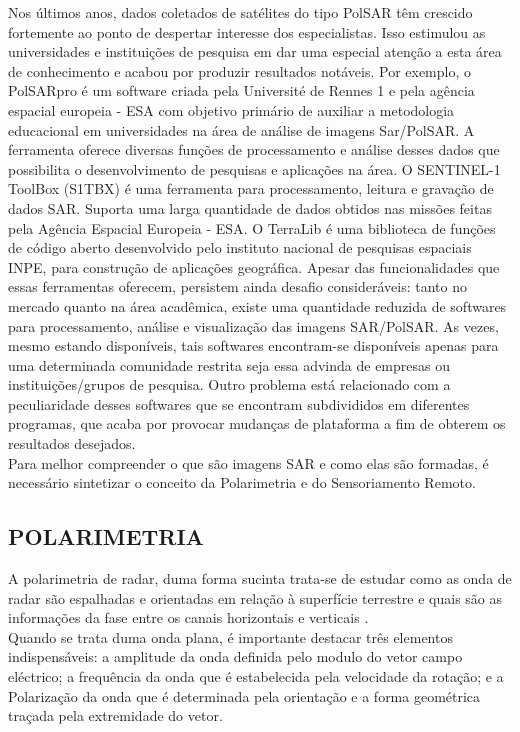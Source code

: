\documentclass[a4paper,12pt]{article}
\begin{document}
Nos últimos anos, dados coletados de satélites do tipo PolSAR têm crescido fortemente ao ponto de despertar interesse dos especialistas. Isso estimulou as universidades e instituições de pesquisa em dar uma especial atenção a esta área de conhecimento e acabou por produzir resultados notáveis.
Por exemplo, o PolSARpro é um software criada pela Université de Rennes 1 e pela agência espacial europeia - ESA com objetivo primário de auxiliar a metodologia educacional em universidades na área de análise de imagens Sar/PolSAR. A ferramenta oferece diversas funções de processamento e análise desses dados que possibilita o desenvolvimento de pesquisas e aplicações na área. O SENTINEL-1 ToolBox (S1TBX) é uma ferramenta para processamento, leitura e gravação de dados SAR. Suporta uma larga quantidade de dados obtidos
nas missões feitas pela Agência Espacial Europeia - ESA. O TerraLib é uma biblioteca de funções de código aberto desenvolvido pelo instituto nacional de pesquisas espaciais INPE, para construção de aplicações geográfica. Apesar das funcionalidades que essas ferramentas oferecem, persistem ainda desafio consideráveis: tanto no mercado quanto na área acadêmica, existe uma quantidade reduzida de softwares para processamento, análise e visualização das imagens SAR/PolSAR. As vezes, mesmo estando disponíveis, tais softwares encontram-se disponíveis apenas para uma determinada comunidade restrita seja essa advinda de empresas ou instituições/grupos de pesquisa. Outro problema está relacionado com a peculiaridade desses softwares que se encontram subdivididos em diferentes programas, que acaba por provocar mudanças de plataforma a fim de obterem os resultados desejados.\\

Para melhor compreender o que são imagens SAR e como elas são formadas, é necessário sintetizar o conceito da Polarimetria e do Sensoriamento Remoto.\\

\subsection{POLARIMETRIA}
\label{subsec:Pol}

A polarimetria de radar, duma forma sucinta trata-se de estudar como as onda de radar são espalhadas e orientadas em relação à superfície terrestre e quais são as informações da fase entre os canais horizontais e verticais \cite{nilosergio2012}.\\

Quando se trata duma onda plana, é importante destacar três elementos indispensáveis: a amplitude da onda definida pelo modulo do vetor campo eléctrico; a frequência da onda que é estabelecida pela velocidade da rotação; e a Polarização da onda que é determinada pela orientação e a forma geométrica traçada pela extremidade do vetor.\\
\end{document}
